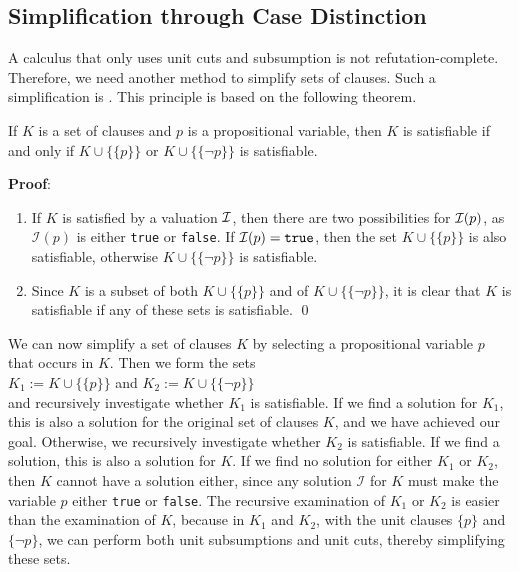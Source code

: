\subsection{Simplification through Case Distinction}
A calculus that only uses unit cuts and subsumption is not refutation-complete. Therefore, we need another method to simplify sets of clauses.
Such a simplification is . This principle is based on the following theorem.

\begin{Proposition}
  If $K$ is a set of clauses and $p$ is a propositional variable,
  then $K$ is satisfiable if and only if $K \cup \bigl\{\{p\}\bigr\}$ or
  $K \cup \bigl\{\{\neg p\}\bigr\}$ is satisfiable.
\end{Proposition}

\noindent
\textbf{Proof}:
\begin{enumerate}
\item[``$\Rightarrow$'':] 
  If $K$ is satisfied by a valuation $\mathcal{I}$, then there are two possibilities for $\mathcal{I}(p)$, as 
  $\mathcal{I}(p)$ is either \texttt{true} or \texttt{false}. If $\mathcal{I}(p) = \texttt{true}$, then the set $K \cup
  \bigl\{\{p\}\bigr\}$ is also satisfiable,
  otherwise $K \cup \bigl\{\{\neg p\}\bigr\}$
  is satisfiable.
\item[``$\Leftarrow$'':] 
  Since $K$ is a subset of both $K \cup \bigl\{\{p\}\bigr\}$ and of 
  $K \cup \bigl\{\{\neg p\}\bigr\}$, it is clear that $K$ is satisfiable
  if any of these sets is satisfiable.
\qed
\end{enumerate}

We can now simplify a set of clauses $K$ by selecting a propositional variable $p$ that occurs in $K$.
Then we form the sets \\[0.2cm]
\hspace*{1.3cm} $K_1 := K \cup \bigl\{\{p\}\bigr\}$ \quad and \quad $K_2 := K \cup
\bigl\{\{\neg p\}\bigr\}$
\\[0.2cm]
and recursively investigate whether $K_1$ is satisfiable. If we find a solution for $K_1$,
this is also a solution for the original set of clauses $K$, and we have achieved our goal.
Otherwise, we recursively investigate whether $K_2$ is satisfiable.
If we find a solution, this is also a solution for $K$. If we find no solution
for either $K_1$ or $K_2$, then $K$ cannot have a solution either,
since any solution $\mathcal{I}$ for $K$ must make the variable $p$ either \texttt{true} or \texttt{false}.
The recursive examination of $K_1$ or $K_2$ is easier than the examination of $K$,
because in $K_1$ and $K_2$, with the unit clauses $\{p\}$ and $\{\neg p\}$,
we can perform both unit subsumptions and unit cuts, thereby simplifying these sets.

